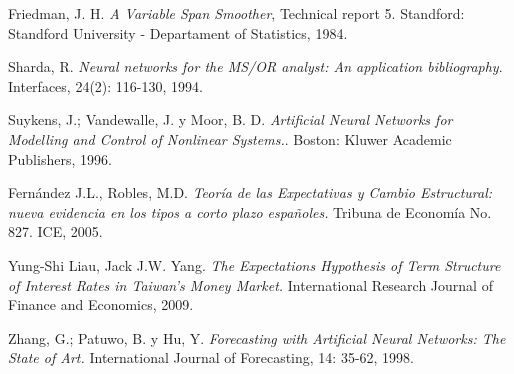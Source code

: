 \begin{thebibliography}{99}
 {\sc Friedman, J. H.} {\it A Variable Span Smoother}, Technical report 5. Standford:
Standford University - Departament of Statistics, 1984.


 {\sc Sharda, R.} {\it Neural networks for the MS/OR analyst: An application bibliography}. Interfaces, 24(2): 116-130, 1994.

 {\sc Suykens, J.; Vandewalle, J. y Moor, B. D.} {\it Artificial Neural Networks for Modelling and Control of Nonlinear Systems.}. Boston: Kluwer Academic Publishers, 1996.

 {\sc Fern\'andez J.L., Robles, M.D.}  {\it Teor\'ia de las Expectativas y Cambio Estructural: nueva evidencia en los tipos a corto plazo espa\~noles.} Tribuna de Econom\'ia No. 827. ICE, 2005.

 {\sc Yung-Shi Liau, Jack J.W. Yang.} {\it The Expectations Hypothesis of Term Structure of Interest Rates in Taiwan's Money Market.} International Research Journal of Finance and Economics, 2009.

 {\sc Zhang, G.; Patuwo, B. y Hu, Y.} {\it Forecasting with Artificial Neural Networks: The State of Art.} International Journal of Forecasting, 14: 35-62, 1998.

\end{thebibliography}
